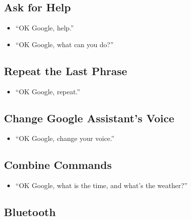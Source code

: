 \documentclass[
  jou,
  floatsintext,
  longtable,
  a4paper,
  nolmodern,
  notxfonts,
  notimes,
  colorlinks=true,linkcolor=blue,citecolor=blue,urlcolor=blue]{apa7}
\providecommand{\tightlist}{%
  \setlength{\itemsep}{0pt}\setlength{\parskip}{0pt}}
\begin{document}
\subsection{Ask for Help}\label{ask-for-help}

\begin{itemize}
\tightlist
\item
  ``OK Google, help.''
\item
  ``OK Google, what can you do?''
\end{itemize}

\subsection{Repeat the Last Phrase}\label{repeat-the-last-phrase}

\begin{itemize}
\tightlist
\item
  ``OK Google, repeat.''
\end{itemize}

\subsection{Change Google Assistant's
Voice}\label{change-google-assistants-voice}

\begin{itemize}
\tightlist
\item
  ``OK Google, change your voice.''
\end{itemize}

\subsection{Combine Commands}\label{combine-commands}

\begin{itemize}
\tightlist
\item
  ``OK Google, what is the time, and what's the weather?''
\end{itemize}

\subsection{Bluetooth}\label{bluetooth}
\end{document}

